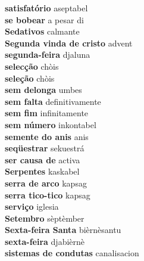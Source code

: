 \textbf{ satisfatório  } aseptabel \\
\textbf{ se bobear  } a pesar di \\
\textbf{ Sedativos  } calmante \\
\textbf{ Segunda vinda de cristo  } advent \\
\textbf{ segunda-feira  } djaluna \\
\textbf{ selecção  } chòis \\
\textbf{ seleção  } chòis \\
\textbf{ sem delonga  } umbes \\
\textbf{ sem falta  } definitivamente \\
\textbf{ sem fim  } infinitamente \\
\textbf{ sem número  } inkontabel \\
\textbf{ semente do anis  } anis \\
\textbf{ seqüestrar  } sekuestrá \\
\textbf{ ser causa de  } activa \\
\textbf{ Serpentes  } kaskabel \\
\textbf{ serra de arco  } kapsag \\
\textbf{ serra tico-tico  } kapsag \\
\textbf{ serviço  } iglesia \\
\textbf{ Setembro  } sèptèmber \\
\textbf{ Sexta-feira Santa  } bièrnèsantu \\
\textbf{ sexta-feira  } djabièrnè \\
\textbf{ sistemas de condutas  } canalisacion \\
